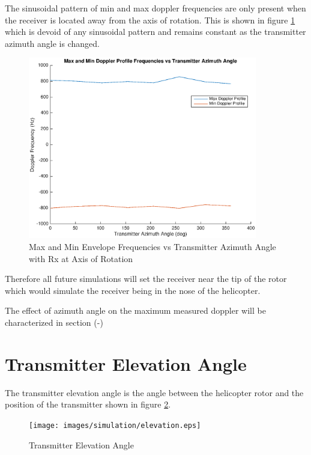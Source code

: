 The sinusoidal pattern of min and max doppler frequencies are only present when the receiver is located away from the axis of rotation. This is shown in figure \ref{fig:tx_azimuth_rx0} which is devoid of any sinusoidal pattern and remains constant as the transmitter azimuth angle is changed. 

\begin{figure}
	\begin{center}
		\includegraphics[width=10cm]{images/simulation/Azimuth_angle_rx0_max_doppler.eps}
		\caption{Max and Min Envelope Frequencies vs Transmitter Azimuth Angle with Rx at Axis of Rotation}
		\label{fig:tx_azimuth_rx0}
	\end{center}
\end{figure}

Therefore all future simulations will set the receiver near the tip of the rotor which would simulate the receiver being in the nose of the helicopter.

The effect of azimuth angle on the maximum measured doppler will be characterized in section (-)

\section{Transmitter Elevation Angle}
The transmitter elevation angle is the angle between the helicopter rotor and the position of the transmitter shown in figure \ref{fig:azimuth_rel}.

\begin{figure}
	\begin{center}
		\texttt{[image: images/simulation/elevation.eps]}
		\caption{Transmitter Elevation Angle}
		\label{fig:azimuth_rel}
	\end{center}
\end{figure}

